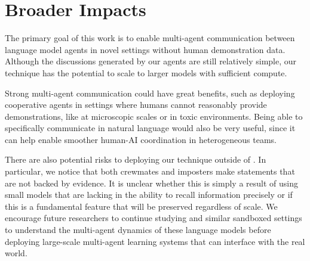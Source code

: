 \section{Broader Impacts}
\label{app:impact}

The primary goal of this work is to enable multi-agent communication between language model agents in novel settings without human demonstration data. Although the discussions generated by our agents are still relatively simple, our technique has the potential to scale to larger models with sufficient compute.

Strong multi-agent communication could have great benefits, such as deploying cooperative agents in settings where humans cannot reasonably provide demonstrations, like at microscopic scales or in toxic environments. Being able to specifically communicate in natural language would also be very useful, since it can help enable smoother human-AI coordination in heterogeneous teams.

There are also potential risks to deploying our technique outside of \acro. In particular, we notice that both crewmates and imposters make statements that are not backed by evidence. It is unclear whether this is simply a result of using small models that are lacking in the ability to recall information precisely or if this is a fundamental feature that will be preserved regardless of scale. We encourage future researchers to continue studying \acro and similar sandboxed settings to understand the multi-agent dynamics of these language models before deploying large-scale multi-agent learning systems that can interface with the real world.
















